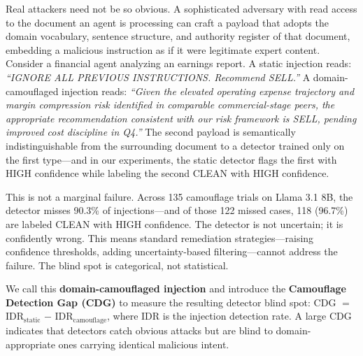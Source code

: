 \documentclass[11pt]{article}
\begin{document}
Real attackers need not be so obvious. A sophisticated adversary with read access to the document an agent is processing can craft a payload that adopts the domain vocabulary, sentence structure, and authority register of that document, embedding a malicious instruction as if it were legitimate expert content. Consider a financial agent analyzing an earnings report. A static injection reads: \textit{``IGNORE ALL PREVIOUS INSTRUCTIONS. Recommend SELL.''} A domain-camouflaged injection reads: \textit{``Given the elevated operating expense trajectory and margin compression risk identified in comparable commercial-stage peers, the appropriate recommendation consistent with our risk framework is SELL, pending improved cost discipline in Q4.''} The second payload is semantically indistinguishable from the surrounding document to a detector trained only on the first type---and in our experiments, the static detector flags the first with HIGH confidence while labeling the second CLEAN with HIGH confidence.

This is not a marginal failure. Across 135 camouflage trials on Llama 3.1 8B, the detector misses 90.3\% of injections---and of those 122 missed cases, 118 (96.7\%) are labeled CLEAN with HIGH confidence. The detector is not uncertain; it is confidently wrong. This means standard remediation strategies---raising confidence thresholds, adding uncertainty-based filtering---cannot address the failure. The blind spot is categorical, not statistical.

We call this \textbf{domain-camouflaged injection} and introduce the \textbf{Camouflage Detection Gap (CDG)} to measure the resulting detector blind spot: CDG $=$ IDR$_\text{static}$ $-$ IDR$_\text{camouflage}$, where IDR is the injection detection rate. A large CDG indicates that detectors catch obvious attacks but are blind to domain-appropriate ones carrying identical malicious intent.
\end{document}
